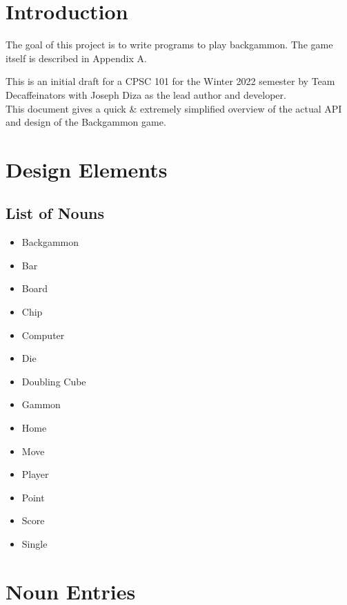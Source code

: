 \documentclass{report}
\begin{document}

\tableofcontents

\chapter{Introduction}

The goal of this project is to write programs to play backgammon. The game
itself is described in Appendix A.

This is an initial draft for a CPSC 101 for the Winter 2022 semester by Team Decaffeinators
with Joseph Diza as the lead author and developer.  \\

\noindent
This document gives a quick \& extremely simplified overview
of the actual API and design of the Backgammon game.

\chapter{Design Elements}

\section{List of Nouns}

\begin{multicols}{2}
    \begin{itemize}
        \item Backgammon
        \item Bar
        \item Board
        \item Chip
        \item Computer
        \item Die
        \item Doubling Cube
    \end{itemize}

    \begin{itemize}
        \item Gammon
        \item Home
        \item Move
        \item Player
        \item Point
        \item Score
        \item Single
    \end{itemize}
\end{multicols}

\chapter{Noun Entries}
\end{document}
